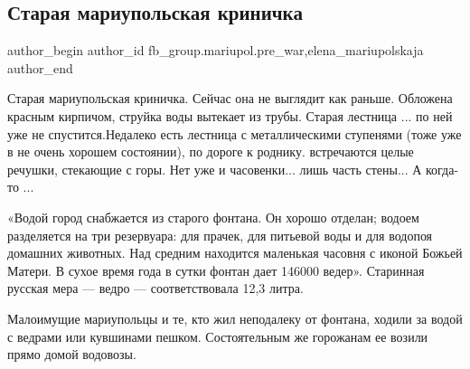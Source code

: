  
 
 
 
 

\subsection{Старая мариупольская криничка}
\label{sec:27_02_2023.fb.fb_group.mariupol.pre_war.7.staraya_mariupolskay}
 
\ifcmt
 author_begin
   author_id fb_group.mariupol.pre_war,elena_mariupolskaja
 author_end
\fi

Старая мариупольская криничка. Сейчас она не выглядит как раньше. Обложена
красным кирпичом, струйка воды вытекает из трубы. Старая лестница ... по ней
уже не спустится.Недалеко есть лестница с металлическими ступенями (тоже уже в
не очень хорошем состоянии), по дороге к роднику. встречаются целые речушки,
стекающие с горы. Нет уже и часовенки... лишь часть стены... А когда-то ...

«Водой город снабжается из старого фонтана. Он хорошо отделан; водоем
разделяется на три резервуара: для прачек, для питьевой воды и для водопоя
домашних животных. Над средним находится маленькая часовня с иконой Божьей
Матери. В сухое время года в сутки фонтан дает 146000 ведер».  Старинная
русская мера — ведро — соответствовала 12,3 литра.

Малоимущие мариупольцы и те, кто жил неподалеку от фонтана, ходили за водой с
ведрами или кувшинами пешком. Состоятельным же горожанам ее возили прямо домой
водовозы.

